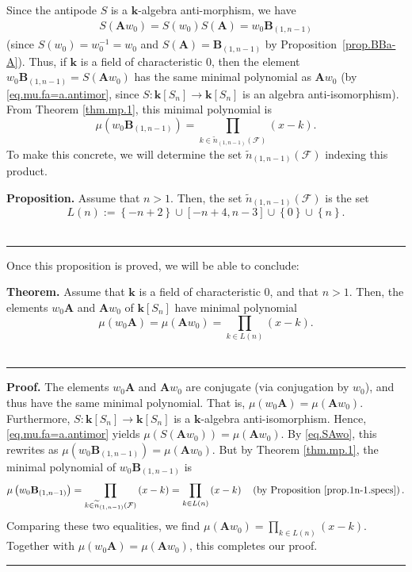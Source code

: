 \documentclass[12pt]{article}
\theoremstyle{definition}%
\newtheorem{thm}{Theorem}[section]
\newtheorem{prop}[thm]{Proposition}
\theoremstyle{definition}%
\theoremstyle{remark}%
\newcommand{\tup}[1]{\left( #1 \right)}
\newcommand{\interval}[1]{\left[ #1 \right]} %
\newcommand{\set}[1]{\left\{ #1 \right\}}
\newcommand{\kk}{\mathbf{k}}
\newcommand{\ksn}{\kk\left[S_n\right]}
\newcommand{\A}{\mathbf{A}}
\newcommand{\BB}{\mathbf{B}}
\newcommand{\BBA}{\BB_{\tup{1,n-1}}}
\newcommand{\CF}{\mathcal{F}}
\newcommand{\wo}{w_0} %
\newcommand{\nn}{\widetilde{n}}%
\newenvironment{thm}[1][Theorem]{\noindent\textbf{#1.} }{\ \rule{0.5em}{0.5em}}
\newenvironment{prop}[1][Proposition]{\noindent\textbf{#1.} }{\ \rule{0.5em}{0.5em}}
\newenvironment{proof}[1][Proof]{\noindent\textbf{#1.} }{\ \rule{0.5em}{0.5em}}
\begin{document}
Since the antipode $S$ is a $\kk$-algebra anti-morphism, we have
\begin{align}
S\tup{\A\wo} = S\tup{\wo} S\tup{\A} = \wo \BBA
\label{eq.SAwo}
\end{align}
(since $S\tup{\wo} = \wo^{-1} = \wo$ and $S\tup{\A} = \BBA$ by Proposition~\ref{prop.BBa-A}).
Thus, if $\kk$ is a field of characteristic $0$,
then %
the element $\wo\BBA = S\tup{ \A\wo } $ has the same minimal polynomial as $\A\wo$
(by \eqref{eq.mu.fa=a.antimor}, since $S : \ksn \to \ksn$ is an algebra anti-isomorphism).
From Theorem \ref{thm.mp.1}, this minimal polynomial is 
\[
\mu\tup{\wo\BBA} = \prod_{k \in \nn_{\tup{ 1,n-1 }}\tup{\CF}} \tup{ x-k }.
\]
To make this concrete, we will determine the set
$\nn_{\tup{1,n-1}}\tup{\CF}$ indexing this product.

\begin{prop}
\label{prop.1n-1.specs}
Assume that $n > 1$. %
Then, the set $\nn_{\tup{1,n-1}}\tup{\CF}$ is the set
\[
L\tup{ n } := \set{-n+2} \cup \interval{-n+4, n-3} \cup \set{0} \cup \set{n}.
\]
\end{prop}

Once this proposition is proved, we will be able to conclude:

\begin{thm}
    \label{bb1_thm2}
    Assume that $\kk$ is a field of characteristic $0$,
	and that $n > 1$.
	Then, the elements $ \wo\A $ and $ \A\wo $ of $ \ksn $ have minimal polynomial
    \[
        \mu\tup{\wo\A}
		= \mu\tup{\A\wo}
		= \prod_{k \in L\tup{ n }} \tup{ x-k }.
    \]
\end{thm}

\begin{proof}
    The elements $ \wo\A $ and $ \A\wo $ are conjugate (via conjugation by $\wo$), and thus have the same minimal polynomial.
	That is, $\mu\tup{\wo\A} = \mu\tup{\A\wo}$.
	Furthermore, $S : \ksn \to \ksn$ is a $\kk$-algebra anti-isomorphism.
	Hence, \eqref{eq.mu.fa=a.antimor} yields
	$\mu\tup{S\tup{\A\wo}} = \mu\tup{\A\wo}$.
	By \eqref{eq.SAwo}, this rewrites as
	$\mu\tup{\wo\BBA} = \mu\tup{\A\wo}$.
	But by Theorem \ref{thm.mp.1}, the minimal polynomial of $ \wo\BBA $ is
    \[
        \mu\tup{\wo\BBA} = \prod_{k \in \nn_{\tup{1,n-1}}\tup{\CF}} \tup{ x-k } = \prod_{k \in L\tup{ n }} \tup{ x-k } \quad\tup{ \text{by Proposition \ref{prop.1n-1.specs}} }.
    \]
    Comparing these two equalities, we find $\mu\tup{\A\wo} = \prod_{k \in L\tup{ n }} \tup{ x-k }$. Together with $\mu\tup{\wo\A} = \mu\tup{\A\wo}$, this completes our proof.
\end{proof}
\end{document}
